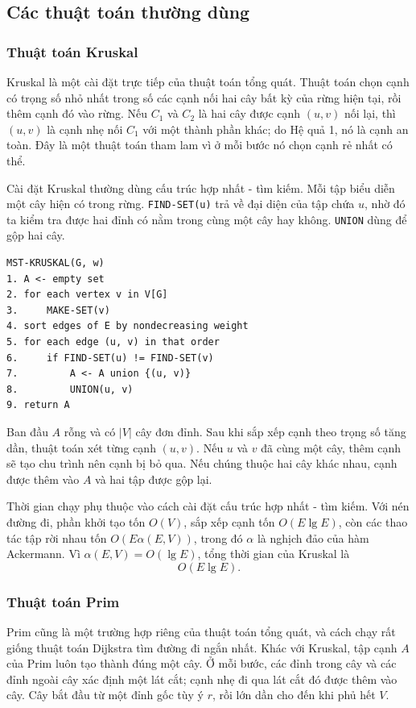 \documentclass[11pt]{article}
\begin{document}
\subsection{Các thuật toán thường dùng}

\subsubsection*{Thuật toán Kruskal}

Kruskal là một cài đặt trực tiếp của thuật toán tổng quát. Thuật toán chọn
cạnh có trọng số nhỏ nhất trong số các cạnh nối hai cây bất kỳ của rừng hiện
tại, rồi thêm cạnh đó vào rừng. Nếu $C_1$ và $C_2$ là hai cây được cạnh
$(u,v)$ nối lại, thì $(u,v)$ là cạnh nhẹ nối $C_1$ với một thành phần khác; do
Hệ quả 1, nó là cạnh an toàn. Đây là một thuật toán tham lam vì ở mỗi bước nó
chọn cạnh rẻ nhất có thể.

Cài đặt Kruskal thường dùng cấu trúc hợp nhất - tìm kiếm. Mỗi tập biểu diễn
một cây hiện có trong rừng. \texttt{FIND-SET(u)} trả về đại diện của tập chứa
$u$, nhờ đó ta kiểm tra được hai đỉnh có nằm trong cùng một cây hay không.
\texttt{UNION} dùng để gộp hai cây.

\begin{verbatim}
MST-KRUSKAL(G, w)
1. A <- empty set
2. for each vertex v in V[G]
3.     MAKE-SET(v)
4. sort edges of E by nondecreasing weight
5. for each edge (u, v) in that order
6.     if FIND-SET(u) != FIND-SET(v)
7.         A <- A union {(u, v)}
8.         UNION(u, v)
9. return A
\end{verbatim}

Ban đầu $A$ rỗng và có $|V|$ cây đơn đỉnh. Sau khi sắp xếp cạnh theo trọng số
tăng dần, thuật toán xét từng cạnh $(u,v)$. Nếu $u$ và $v$ đã cùng một cây,
thêm cạnh sẽ tạo chu trình nên cạnh bị bỏ qua. Nếu chúng thuộc hai cây khác
nhau, cạnh được thêm vào $A$ và hai tập được gộp lại.

Thời gian chạy phụ thuộc vào cách cài đặt cấu trúc hợp nhất - tìm kiếm. Với
nén đường đi, phần khởi tạo tốn $O(V)$, sắp xếp cạnh tốn $O(E\lg E)$, còn các
thao tác tập rời nhau tốn $O(E\alpha(E,V))$, trong đó $\alpha$ là nghịch đảo
của hàm Ackermann. Vì $\alpha(E,V)=O(\lg E)$, tổng thời gian của Kruskal là
\[
  O(E\lg E).
\]

\subsubsection*{Thuật toán Prim}

Prim cũng là một trường hợp riêng của thuật toán tổng quát, và cách chạy rất
giống thuật toán Dijkstra tìm đường đi ngắn nhất. Khác với Kruskal, tập cạnh
$A$ của Prim luôn tạo thành đúng một cây. Ở mỗi bước, các đỉnh trong cây và
các đỉnh ngoài cây xác định một lát cắt; cạnh nhẹ đi qua lát cắt đó được thêm
vào cây. Cây bắt đầu từ một đỉnh gốc tùy ý $r$, rồi lớn dần cho đến khi phủ
hết $V$.
\end{document}

